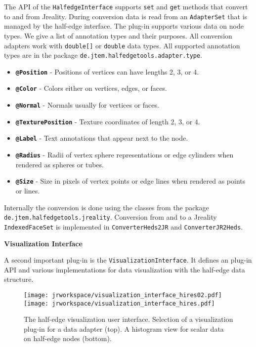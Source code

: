 \documentclass[Thesis.tex]{subfiles}
\begin{document}
The API of the {\tt HalfedgeInterface} supports {\tt set} and {\tt get} methods that convert to and from
{\sc Jreality}. During conversion data is read from an {\tt AdapterSet} that is managed by the half-edge
interface. The plug-in supports various data on node types. We give a list of annotation types and
their purposes. All conversion adapters work with {\tt double[]} or {\tt double} data types. All
supported annotation types are in the package {\tt de.jtem.halfedgetools.adapter.type}.

\begin{itemize}
\item {\tt\bf @Position} - Positions of vertices can have lengths 2, 3, or 4.
\item {\tt\bf @Color} - Colors either on vertices, edges, or faces.
\item {\tt\bf @Normal} - Normals usually for vertices or faces.
\item {\tt\bf @TexturePosition} - Texture coordinates of length 2, 3, or 4.
\item {\tt\bf @Label} - Text annotations that appear next to the node.
\item {\tt\bf @Radius} - Radii of vertex sphere representations or edge cylinders when rendered
as spheres or tubes.
\item {\tt\bf @Size} - Size in pixels of vertex points or edge lines when rendered as points or lines.
\end{itemize}

Internally the conversion is done using the classes from the package 
{\tt de.jtem.halfedge\-tools.jreality}. Conversion from and to a {\sc Jreality} {\tt IndexedFaceSet}
is implemented in {\tt ConverterHeds2JR} and {\tt ConverterJR2Heds}.

{\bf Visualization Interface}

A second important plug-in is the {\tt Visuali\-zation\-Inter\-face}. It defines
an plug-in API and various implementations for data visualization with the half-edge data structure. 


\begin{figure}
	\centering
	\texttt{[image: jrworkspace/visualization\_interface\_hires02.pdf]}
	\texttt{[image: jrworkspace/visualization\_interface\_hires.pdf]}
	\caption[Visualization Interface]{The half-edge visualization user interface. Selection of a visualization
		plug-in for a data adapter (top). A histogram view for scalar data on half-edge nodes (bottom).}
	\label{fig:visualization_interface}
\end{figure}
\end{document}
